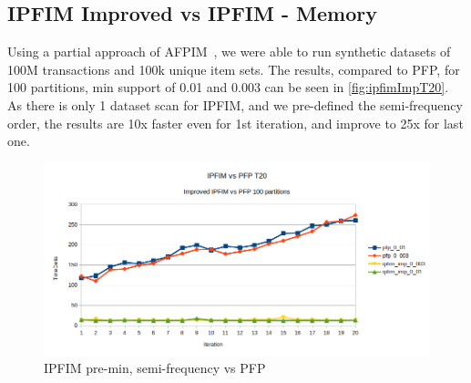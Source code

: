 \subsection{IPFIM Improved vs IPFIM - Memory}
Using a partial approach of AFPIM~\cite{koh2004efficient}, we were able to run synthetic datasets of 100M transactions and 100k unique item sets. The results, compared to PFP, for 100 partitions, min support of 0.01 and 0.003 can be seen  in \autoref{fig:ipfimImpT20}. As there is only 1 dataset scan for IPFIM, and we pre-defined the semi-frequency order, the results are 10x faster even for 1st iteration, and improve to 25x for last one.

\begin{figure}
  \centering
  \includegraphics[width=\linewidth]{figures/t20_ipfim_imp_vs_pfp}
  \caption{IPFIM pre-min, semi-frequency vs PFP}
  \label{fig:ipfimImpT20}
\end{figure}
